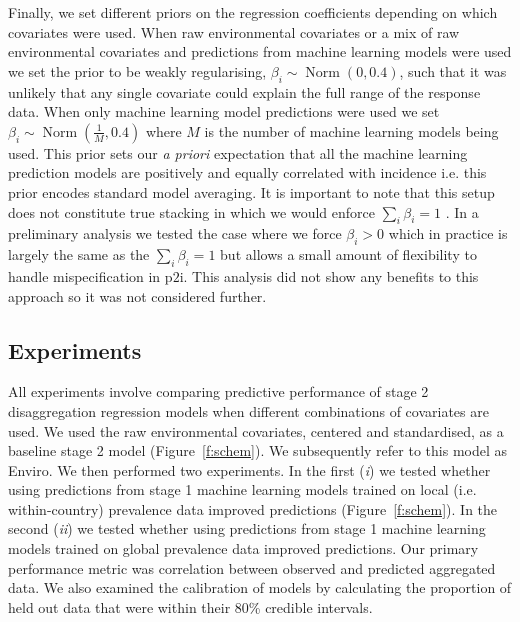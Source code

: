 \documentclass[review]{elsarticle}
\begin{document}
Finally, we set different priors on the regression coefficients depending on which covariates were used.
When raw environmental covariates or a mix of raw environmental covariates and predictions from machine learning models were used we set the prior to be weakly regularising, $\beta_i \sim \operatorname{Norm}(0, 0.4)$, such that it was unlikely that any single covariate could explain the full range of the response data.
When only machine learning model predictions were used we set $\beta_i \sim \operatorname{ Norm}(\frac{1}{M}, 0.4)$ where $M$ is the number of machine learning models being used. 
This prior  sets our \emph{a priori} expectation that all the machine learning prediction models are positively and equally correlated with incidence i.e. this prior encodes standard model averaging.
It is important to note that this setup does not constitute true stacking in which we would enforce $\sum_i \beta_i = 1$ \citep{bhatt2017improved}.
In a preliminary analysis we tested the case where we force $\beta_i > 0$ which in practice is largely the same as the $\sum_i \beta_i = 1$  \citep{breiman1996stacked} but allows a small amount of flexibility to handle mispecification in $\mathrm{p2i}$.
This analysis did not show any benefits to this approach so it was not considered further.



\subsection{Experiments}



All experiments involve comparing predictive performance of stage 2 disaggregation regression models when different combinations of covariates are used.
We used the raw environmental covariates, centered and standardised, as a baseline stage 2 model (Figure~\ref{f:schem}).
We subsequently refer to this model as Enviro.
We then performed two experiments.
In the first (\emph{i}) we tested whether using predictions from stage 1 machine learning models trained on local (i.e. within-country) prevalence data improved predictions (Figure~\ref{f:schem}).
In the second (\emph{ii}) we tested whether using predictions from stage 1 machine learning models trained on global prevalence data improved predictions.
Our primary performance metric was correlation between observed and predicted aggregated  data.
We also examined the calibration of models by calculating the proportion of held out data that were within their 80\% credible intervals.
\end{document}
